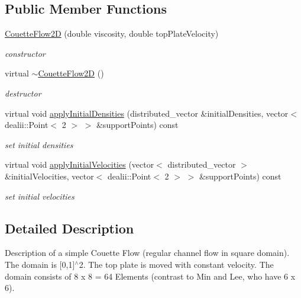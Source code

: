 \subsection*{Public Member Functions}
\begin{DoxyCompactItemize}
\item 
\hyperlink{classnatrium_1_1CouetteFlow2D_a138e7b6edd0fea07aece99bfa5b6ede0}{Couette\-Flow2\-D} (double viscosity, double top\-Plate\-Velocity)
\begin{DoxyCompactList}\small\item\em constructor \end{DoxyCompactList}\item 
\hypertarget{classnatrium_1_1CouetteFlow2D_a97b61b0f71dc653427ba3db46e185873}{virtual \hyperlink{classnatrium_1_1CouetteFlow2D_a97b61b0f71dc653427ba3db46e185873}{$\sim$\-Couette\-Flow2\-D} ()}\label{classnatrium_1_1CouetteFlow2D_a97b61b0f71dc653427ba3db46e185873}

\begin{DoxyCompactList}\small\item\em destructor \end{DoxyCompactList}\item 
virtual void \hyperlink{classnatrium_1_1CouetteFlow2D_ac0dc3c6b3ecc2b19175802d29ab3f78a}{apply\-Initial\-Densities} (distributed\-\_\-vector \&initial\-Densities, vector$<$ dealii\-::\-Point$<$ 2 $>$ $>$ \&support\-Points) const 
\begin{DoxyCompactList}\small\item\em set initial densities \end{DoxyCompactList}\item 
virtual void \hyperlink{classnatrium_1_1CouetteFlow2D_a745711515d9e40be69d5563d678df6a0}{apply\-Initial\-Velocities} (vector$<$ distributed\-\_\-vector $>$ \&initial\-Velocities, vector$<$ dealii\-::\-Point$<$ 2 $>$ $>$ \&support\-Points) const 
\begin{DoxyCompactList}\small\item\em set initial velocities \end{DoxyCompactList}\end{DoxyCompactItemize}


\subsection{Detailed Description}
Description of a simple Couette Flow (regular channel flow in square domain). The domain is \mbox{[}0,1\mbox{]}$^\wedge$2. The top plate is moved with constant velocity. The domain consists of 8 x 8 = 64 Elements (contrast to Min and Lee, who have 6 x 6). 

